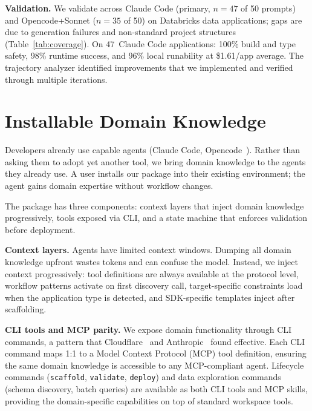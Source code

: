 \documentclass[sigconf,review]{acmart}
\begin{document}
\textbf{Validation.} We validate across Claude Code (primary, $n{=}47$ of 50 prompts) and Opencode+Sonnet ($n{=}35$ of 50) on Databricks data applications; gaps are due to generation failures and non-standard project structures (Table~\ref{tab:coverage}). On 47~Claude Code applications: 100\% build and type safety, 98\% runtime success, and 96\% local runability at \$1.61/app average. The trajectory analyzer identified improvements that we implemented and verified through multiple iterations.

\section{Installable Domain Knowledge}
\label{sec:domain-knowledge}

Developers already use capable agents (Claude Code, Opencode~\cite{opencode2025}). Rather than asking them to adopt yet another tool, we bring domain knowledge to the agents they already use. A user installs our package into their existing environment; the agent gains domain expertise without workflow changes.

The package has three components: context layers that inject domain knowledge progressively, tools exposed via CLI, and a state machine that enforces validation before deployment.

\textbf{Context layers.} Agents have limited context windows. Dumping all domain knowledge upfront wastes tokens and can confuse the model. Instead, we inject context progressively: tool definitions are always available at the protocol level, workflow patterns activate on first discovery call, target-specific constraints load when the application type is detected, and SDK-specific templates inject after scaffolding.

\textbf{CLI tools and MCP parity.} We expose domain functionality through CLI commands, a pattern that Cloudflare~\cite{cloudflare2024codemode} and Anthropic~\cite{anthropic2024tools} found effective. Each CLI command maps 1:1 to a Model Context Protocol (MCP) tool definition, ensuring the same domain knowledge is accessible to any MCP-compliant agent. Lifecycle commands (\texttt{scaffold}, \texttt{validate}, \texttt{deploy}) and data exploration commands (schema discovery, batch queries) are available as both CLI tools and MCP skills, providing the domain-specific capabilities on top of standard workspace tools.
\end{document}
